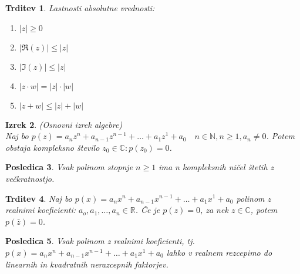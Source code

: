 \documentclass[11pt]{article}
\newtheorem{Izrek}{{\sc Izrek}}[section]
\newtheorem{Trditev}[Izrek]{{\sc Trditev}}
\newtheorem{Posledica}[Izrek]{{\sc Posledica}}
\begin{document}
\begin{Trditev}
	Lastnosti absolutne vrednosti:
	\begin{enumerate}
		\item
		$|z| \ge 0$
		\item
		$|\Re(z)| \le |z|$
		\item
		$|\Im(z)| \le |z|$
		\item
		$|z\cdot w| = |z| \cdot |w|$
		\item
		$|z+w| \le |z| +|w|$
	\end{enumerate}
\end{Trditev}

\begin{Izrek}
	(Osnovni izrek algebre) \\
	Naj bo $p(z) = a_nz^n + a_{n-1}z^{n-1} + \dots + a_1z^1 + a_0 \quad n\in\mathbb{N}, n\ge 1, a_n \ne 0$. Potem obstaja kompleksno število  $z_0 \in\mathbb{C} : p(z_0 ) = 0$.
\end{Izrek}
\begin{Posledica}
	Vsak polinom stopnje $n\ge 1$ ima n kompleksnih ničel štetih z večkratnostjo.
\end{Posledica}
\begin{Trditev}
	Naj bo $p(x) = a_nx^n + a_{n-1}x^{n-1} + \dots + a_1x^1 + a_0$ polinom z realnimi koeficienti: $a_o,a_1, \dots, a_n \in \mathbb{R}$. Če je $p(z) = 0 $, za nek $z\in \mathbb{C}$, potem $p(\bar{z}) = 0$.
\end{Trditev}
\begin{Posledica}
	Vsak polinom z realnimi koeficienti, tj. $p(x) = a_nx^n + a_{n-1}x^{n-1} + \dots + a_1x^1 + a_0$ lahko v realnem rezcepimo do linearnih in kvadratnih nerazcepnih faktorjev.
\end{Posledica}
\end{document}
